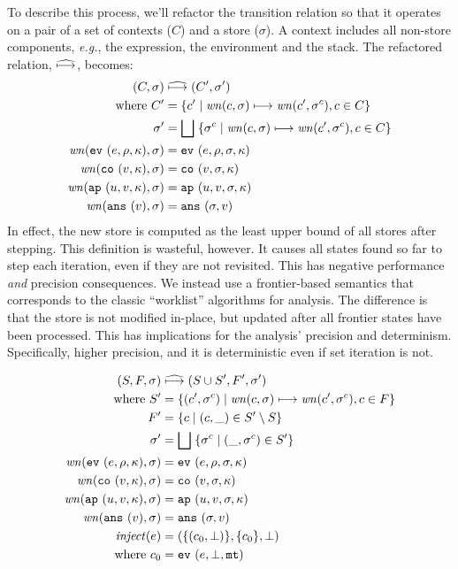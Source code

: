 \documentclass[preprint,onecolumn,9pt]{sigplanconf} %
\begin{document}
To describe this process, we'll refactor the transition relation so that it operates on
a pair of a set of contexts ($C$) and a store ($\sigma$).
%
A context includes all non-store components, \emph{e.g.}, the expression, the environment and the stack.
%
The refactored relation, $\widehat{\mathbin{\longmapsto}}$, becomes:
%
\begin{align*}
(C, \sigma) &\mathrel{\widehat{\mathbin{\longmapsto}}} (C', \sigma') \\
\mbox{where } C' &= \{c' \mid \mathit{wn}(c, \sigma) \mathrel{\mathbin{\longmapsto}} \mathit{wn}(c', \sigma^c), c \in C\} \\
              \sigma' &= \bigsqcup\; \{\sigma^c \mid \mathit{wn}(c,\sigma)\mathrel{\mathbin{\longmapsto}} \mathit{wn}(c', \sigma^c), c \in C\} \\
\mathit{wn}({\tt ev{\ }}({e, \rho, \kappa}), \sigma) &= {\tt ev{\ }}({e, \rho, \sigma, \kappa}) \\
\mathit{wn}({\tt co{\ }}({v, \kappa}), \sigma) &= {\tt co{\ }}({v, \sigma, \kappa}) \\
\mathit{wn}({\tt ap{\ }}({u, v, \kappa}), \sigma) &= {\tt ap{\ }}({u, v, \sigma, \kappa}) \\
\mathit{wn}({\tt ans{\ }}({v}), \sigma) &= {\tt ans{\ }}({\sigma, v})
\end{align*}
%
In effect, the new store is computed as the least upper bound of all
stores after stepping. This definition is wasteful, however. It causes
all states found so far to step each iteration, even if they are not
revisited. This has negative performance \emph{and} precision
consequences. We instead use a frontier-based semantics that
corresponds to the classic ``worklist'' algorithms for analysis. The
difference is that the store is not modified in-place, but updated
after all frontier states have been processed. This has implications
for the analysis' precision and determinism. Specifically, higher
precision, and it is deterministic even if set iteration is not.

\begin{align*}
(S, F, \sigma) &\mathrel{\widehat{\mathbin{\longmapsto}}} (S \cup S', F', \sigma') \\
\mbox{where } S' &= \{(c',\sigma^c) \mid \mathit{wn}(c, \sigma) \mathrel{\mathbin{\longmapsto}} \mathit{wn}(c', \sigma^c), c \in F\} \\
              F' &= \{c \mid (c,\_) \in S' \setminus S\} \\
              \sigma' &= \bigsqcup\; \{\sigma^c \mid (\_,\sigma^c) \in S'\} \\
\mathit{wn}({\tt ev{\ }}({e, \rho, \kappa}), \sigma) &= {\tt ev{\ }}({e, \rho, \sigma, \kappa}) \\
\mathit{wn}({\tt co{\ }}({v, \kappa}), \sigma) &= {\tt co{\ }}({v, \sigma, \kappa}) \\
\mathit{wn}({\tt ap{\ }}({u, v, \kappa}), \sigma) &= {\tt ap{\ }}({u, v, \sigma, \kappa}) \\
\mathit{wn}({\tt ans{\ }}({v}), \sigma) &= {\tt ans{\ }}({\sigma, v}) \\
\mathit{inject}(e) &= (\{(c_0, \bot)\},\{c_0\},\bot) \\
\text{ where } c_0 &= {\tt ev{\ }}({e,\bot,{\tt mt}})
\end{align*}
\end{document}
